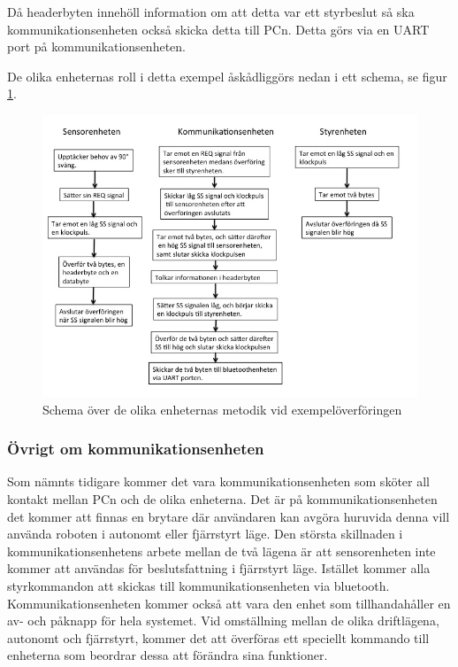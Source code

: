 Då headerbyten innehöll information om att detta var ett styrbeslut så ska kommunikationsenheten också skicka detta till PCn. Detta görs via en UART port på kommunikationsenheten.

De olika enheternas roll i detta exempel åskådliggörs nedan i ett schema, se figur \ref{fig:schema}.


\begin{figure}[H]
 \centering
\includegraphics[angle=0,scale=0.7]{bilder/Schema_exempel.png}
  \caption{Schema över de olika enheternas metodik vid exempelöverföringen}
  \label{fig:schema}
\end{figure}

\subsubsection{Övrigt om kommunikationsenheten}

Som nämnts tidigare kommer det vara kommunikationsenheten som sköter all kontakt mellan PCn och de olika enheterna. Det är på kommunikationsenheten det kommer att finnas en brytare där användaren kan avgöra huruvida denna vill använda roboten i autonomt eller fjärrstyrt läge. Den största skillnaden i kommunikationsenhetens arbete mellan de två lägena är att sensorenheten inte kommer att användas för beslutsfattning i fjärrstyrt läge. Istället kommer alla styrkommandon att skickas till kommunikationsenheten via bluetooth. Kommunikationsenheten kommer också att vara den enhet som tillhandahåller en av- och påknapp för hela systemet.
Vid omställning mellan de olika driftlägena, autonomt och fjärrstyrt, kommer det att överföras ett speciellt kommando till enheterna som beordrar dessa att förändra sina funktioner.  

